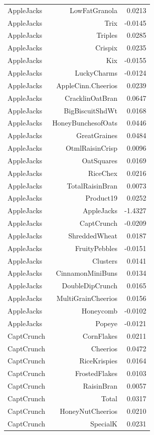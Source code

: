 \begin{longtable}{@{}lrr@{}}
AppleJacks & LowFatGranola & 0.0213 \\
AppleJacks & Trix & -0.0145 \\
AppleJacks & Triples & 0.0285 \\
AppleJacks & Crispix & 0.0235 \\
AppleJacks & Kix & -0.0155 \\
AppleJacks & LuckyCharms & -0.0124 \\
AppleJacks & AppleCinn.Cheerios & 0.0239 \\
AppleJacks & CracklinOatBran & 0.0647 \\
AppleJacks & BigBiscuitShdWt & 0.0168 \\
AppleJacks & HoneyBunchesofOats & 0.0446 \\
AppleJacks & GreatGraines & 0.0484 \\
AppleJacks & OtmlRaisinCrisp & 0.0096 \\
AppleJacks & OatSquares & 0.0169 \\
AppleJacks & RiceChex & 0.0216 \\
AppleJacks & TotalRaisinBran & 0.0073 \\
AppleJacks & Product19 & 0.0252 \\
AppleJacks & AppleJacks & -1.4327 \\
AppleJacks & CaptCrunch & -0.0209 \\
AppleJacks & ShreddedWheat & 0.0187 \\
AppleJacks & FruityPebbles & -0.0151 \\
AppleJacks & Clusters & 0.0141 \\
AppleJacks & CinnamonMiniBuns & 0.0134 \\
AppleJacks & DoubleDipCrunch & 0.0165 \\
AppleJacks & MultiGrainCheerios & 0.0156 \\
AppleJacks & Honeycomb & -0.0102 \\
AppleJacks & Popeye & -0.0121 \\
CaptCrunch & CornFlakes & 0.0211 \\
CaptCrunch & Cheerios & 0.0472 \\
CaptCrunch & RiceKrispies & 0.0164 \\
CaptCrunch & FrostedFlakes & 0.0103 \\
CaptCrunch & RaisinBran & 0.0057 \\
CaptCrunch & Total & 0.0317 \\
CaptCrunch & HoneyNutCheerios & 0.0210 \\
CaptCrunch & SpecialK & 0.0231 \\

\end{longtable}
